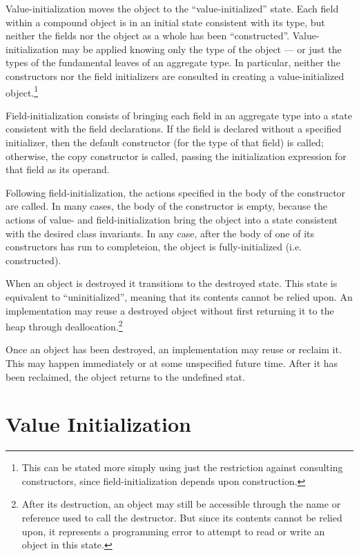 Value-initialization moves the object to the ``value-initialized'' state.  Each
field within a compound object is in an initial state consistent with its type,
but neither the fields nor the object as a whole has been ``constructed''.
Value-initialization may be applied knowing only the type of the object --- or
just the types of the fundamental leaves of an aggregate type.  In particular,
neither the constructors nor the field initializers are consulted in creating a
value-initialized object.\footnote{This can be stated more simply using just the
  restriction against consulting constructors, since field-initialization
  depends upon construction.}

Field-initialization consists of bringing each field in an aggregate type into a
state consistent with the field declarations.  If the field is declared without
a specified initializer, then the default constructor (for the type of that
field) is called; otherwise, the copy constructor is called, passing the
initialization expression for that field as its operand.

Following field-initialization, the actions specified in the body of the
constructor are called.  In many cases, the body of the constructor is empty,
because the actions of value- and field-initialization bring the object into a
state consistent with the desired class invariants.  In any case, after the body
of one of its constructors has run to completeion, the object is
fully-initialized (i.e. constructed).

When an object is destroyed it transitions to the destroyed state.  This state
is equivalent to ``uninitialized'', meaning that its contents cannot be relied
upon.  An implementation may reuse a destroyed object without first returning it
to the heap through deallocation.\footnote{After its destruction, an object may
  still be accessible through the name or reference used to call the
  destructor.  But since its contents cannot be relied upon, it represents a
  programming error to attempt to read or write an object in this state.}

Once an object has been destroyed, an implementation may reuse or reclaim it.
This may happen immediately or at some unspecified future time.  After it has
been reclaimed, the object returns to the undefined stat.

\section{Value Initialization}

